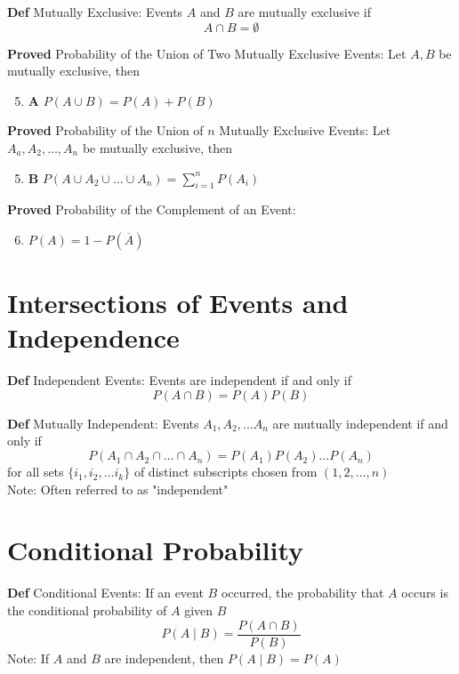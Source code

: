 \documentclass[11pt,notitlepage]{report}
\begin{document}
\textbf{Def} Mutually Exclusive: Events $A$ and $B$ are mutually exclusive if
$$A \cap B = \emptyset$$



\textbf{Proved} Probability of the Union of Two Mutually Exclusive Events: Let $A, B$ be mutually exclusive, then
\begin{enumerate}
    \setcounter{enumi}{4}
    \item \textbf A $P(A \cup B) = P(A) + P(B)$
\end{enumerate}
\textbf{Proved} Probability of the Union of $n$ Mutually Exclusive Events: Let $A_a, A_2, \dots, A_n$ be mutually exclusive, then
\begin{enumerate}
    \setcounter{enumi}{4}
    \item \textbf B $P(A \cup A_2 \cup \dots \cup A_n) = \sum_{i = 1}^n P(A_i)$
\end{enumerate}
\textbf{Proved} Probability of the Complement of an Event: \begin{enumerate}
    \setcounter{enumi}{5}
    \item $P(A) = 1 - P(\overline A)$
\end{enumerate}


\newpage
\section{Intersections of Events and Independence}

\textbf{Def} Independent Events: Events are independent if and only if
$$P(A \cap B) = P(A)P(B)$$

\textbf{Def} Mutually Independent: Events $A_1, A_2, \dots A_n$ are mutually independent if and only if
$$P(A_1 \cap A_2 \cap \dots \cap A_n) = P(A_1)P(A_2)\dots P(A_n)$$
for all sets $\{i_1, i_2, \dots i_k\}$ of distinct subscripts chosen from $(1, 2, \dots, n)$\\
\hspace*{5mm} Note: Often referred to as "independent"

\section{Conditional Probability}


\textbf{Def} Conditional Events: If an event $B$ occurred, the probability that $A$ occurs is the conditional probability of $A$ given $B$
$$P(A \mid B) = \frac{P(A \cap B)}{P(B)}$$
\hspace*{5mm} Note: If $A$ and $B$ are independent, then $P(A \mid B) = P(A)$
\end{document}
